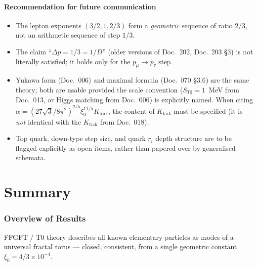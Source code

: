 \subsection{Recommendation for future communication}

\begin{itemize}[leftmargin=2em,itemsep=2pt,topsep=2pt]
  \item The lepton exponents $(3/2, 1, 2/3)$ form a
        \emph{geometric} sequence of ratio $2/3$, not an arithmetic
        sequence of step $1/3$.
  \item The claim \enquote{$\Delta p = 1/3 = 1/D$} (older versions
        of Doc.~202, Doc.~203 §3) is not literally satisfied; it
        holds only for the $p_\mu \to p_\tau$ step.
  \item Yukawa form (Doc.~006) and maximal formula (Doc.~070 §3.6)
        are the same theory; both are usable provided the scale
        convention ($S_{T0} = 1$~MeV from Doc.~013, or Higgs matching
        from Doc.~006) is explicitly named. When citing
        $\alpha = (27\sqrt{3}/8\pi^2)^{2/5}\xi_0^{11/5} K_{\text{frak}}$,
        the content of $K_{\text{frak}}$ must be specified (it is
        \emph{not} identical with the $K_{\text{frak}}$ from Doc.~018).
  \item Top quark, down-type step size, and quark $r_i$ depth
        structure are to be flagged explicitly as open items,
        rather than papered over by generalised schemata.
\end{itemize}

\part{Summary}

\section{Overview of Results}

FFGFT / T0 theory describes all known elementary particles as modes
of a universal fractal torus — closed, consistent, from a single
geometric constant $\xi_0 = 4/3 \times 10^{-4}$.

